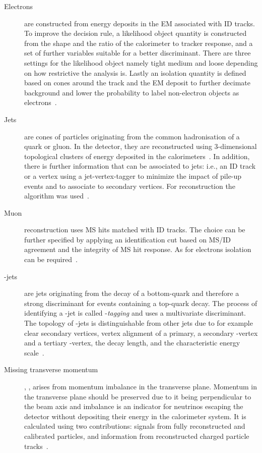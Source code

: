 \begin{description}
\item[Electrons] 
are constructed from energy deposits in the EM associated with ID tracks.
To improve the decision rule, a likelihood object quantity is constructed from the shape and the ratio of the calorimeter to tracker response, and a set of further variables suitable for a better discriminant. There are three settings for the likelihood object namely tight medium and loose depending on how restrictive the analysis is.
Lastly an isolation quantity is defined based on cones around the track and the EM deposit to further decimate background and lower the probability to label non-electron objects as electrons~\cite{ATLAS-CONF-2016-024}.
\item[Jets] are cones of particles originating from the common hadronisation of a quark or gluon. In the detector, they are reconstructed using 3-dimensional topological clusters of energy deposited in the calorimeters~\cite{Aad:2016upy}. In addition, there is further information that can be associated to jets: {i.e.}, an ID track or a vertex using a jet-vertex-tagger to minimize the impact of pile-up events and to associate to secondary vertices. For reconstruction the \antikt\xspace algorithm was used~\cite{Cacciari:2008gp}.
\item[Muon] reconstruction uses MS hits matched with ID tracks. The choice can be further specified by applying an identification cut based on MS/ID agreement and the integrity of MS hit response. As for electrons isolation can be required~\cite{Aad:2016jkr}.
\item[\Pbottom-jets] are jets originating from the decay of a bottom-quark and therefore a strong discriminant for events containing a top-quark decay. The process of identifying a \Pbottom-jet is called \Pbottom-\emph{tagging} and uses a multivariate discriminant. The topology of \Pbottom-jets is distinguishable from other jets due to for example clear secondary vertices, vertex alignment of a primary, a secondary \Pbottom-vertex and a tertiary \Pcharm-vertex, the decay length, and the characteristic energy scale~\cite{Aad:2110203, ATL-PHYS-PUB-2016-012}.
\item[Missing transverse momentum]
, \pTmiss, arises from momentum imbalance in the transverse plane. Momentum in the transverse plane should be preserved due to it being perpendicular to the beam axis and imbalance is an indicator for neutrinos escaping the detector without depositing their energy in the calorimeter system. It is calculated using two contributions: signals from fully reconstructed and calibrated particles, and information from reconstructed charged particle tracks~\cite{Aaboud:2018tkc}.
\end{description}

